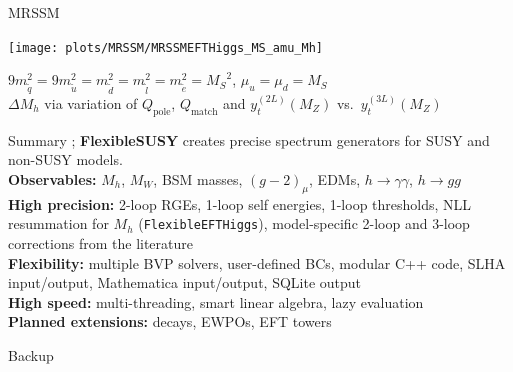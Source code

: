 \documentclass[hyperref={pdfpagelabels=false},ngerman]{beamer}
\newcommand{\MS}{\ensuremath{M_S}}
\renewcommand{\emph}{\textbf}
\newcommand{\pole}{\ensuremath{\text{pole}}}
\begin{document}
\begin{frame}{MRSSM}
  \begin{center}
    \texttt{[image: plots/MRSSM/MRSSMEFTHiggs\_MS\_amu\_Mh]}
  \end{center}
  $9 m_{\tilde{q}}^2 = 9 m_{\tilde{u}}^2 = m_{\tilde{d}}^2 =
  m_{\tilde{l}}^2 = m_{\tilde{e}}^2 = \MS^2$, $\mu_u = \mu_d = \MS$\\
  $\Delta M_h$ via variation of $Q_\pole$, $Q_\text{match}$ and $y_t^{(2L)}(M_Z)$ vs.\ $y_t^{(3L)}(M_Z)$
\end{frame}

\begin{frame}{Summary}
  ;%
  \emph{FlexibleSUSY} creates precise spectrum generators for SUSY and
  non-SUSY models.\\[1em]
  \emph{Observables:} $M_h$, $M_W$, BSM masses, $(g-2)_\mu$, EDMs,
  $h\rightarrow\gamma\gamma$, $h\rightarrow gg$
  \\[0.5em]
  \emph{High precision:} 2-loop RGEs, 1-loop self energies, 1-loop
  thresholds, NLL resummation for $M_h$ (\texttt{FlexibleEFTHiggs}),
  model-specific 2-loop and 3-loop corrections from the literature
  \\[0.5em]
  \emph{Flexibility:} multiple BVP solvers, user-defined BCs, modular
  C++ code, SLHA input/output, Mathematica input/output, SQLite output
  \\[0.5em]
  \emph{High speed:} multi-threading, smart linear algebra, lazy evaluation
  \\[1em]
  \emph{Planned extensions:} decays, EWPOs, EFT towers
\end{frame}

\begin{frame}[noframenumbering]
  \begin{center}
    \Huge Backup
  \end{center}
\end{frame}
\end{document}
